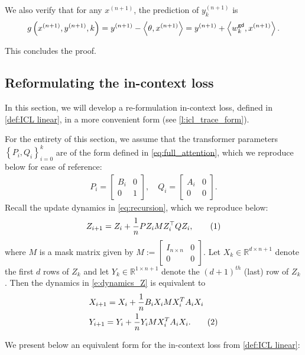 \documentclass{article}
\newcommand{\R}{\mathbb{R}}
\renewcommand{\aa}{M}
\newcommand{\tx}[1]{x^{(#1)}}
\newcommand{\ty}[1]{y^{(#1)}}
\newcommand{\wgd}{w^{\sf gd}}
\newcommand*\lin[1]{\left\langle #1 \right\rangle}
\newcommand*\lrp[1]{\left( #1 \right)}
\newcommand*\lrbb[1]{\left\{ #1 \right\}}
\newcommand\numberthis{\addtocounter{equation}{1}\tag{\theequation}}
\begin{document}
We also verify that for any $\tx{n+1}$, the prediction of $\ty{n+1}_k$ is 
\begin{align*}
g\lrp{\tx{n+1}, \ty{n+1}, k} = \ty{n+1} -\lin{\theta, \tx{n+1}} = \ty{n+1} + \lin{\wgd_k, \tx{n+1}}.
\end{align*}

This concludes the proof.



 
\subsection{Reformulating the in-context loss}
In this section, we will develop a re-formulation in-context loss, defined in \eqref{def:ICL linear}, in a more convenient form (see \autoref{l:icl_trace_form}).

For the entirety of this section, we assume that the transformer parameters $\lrbb{P_i,Q_i}_{i=0}^k$ are of the form defined in \eqref{eq:full_attention}, which we reproduce below for ease of reference:
\begin{align}
P_i = \begin{bmatrix}
B_i & 0 \\ 
0 & 1
\end{bmatrix}, \quad Q_i = \begin{bmatrix}
A_i & 0 \\ 
0 & 0
\end{bmatrix}.
\end{align}
Recall the update dynamics in \eqref{eq:recursion}, which we reproduce below:
\begin{align*}
Z_{i+1} = Z_{i} + \frac{1}{n}  P Z_i \aa Z_i^\top Q Z_i,
\numberthis \label{e:dynamics_Z}
\end{align*}
where $M$ is a mask matrix given by $M := \begin{bmatrix}I_{n\times n} & 0 \\ 0 & 0\end{bmatrix}$. Let $X_k \in \R^{d\times n+1}$ denote the first $d$ rows of $Z_k$ and let $Y_k \in \R^{1\times n+1}$ denote the $(d+1)^{th}$ (last) row of $Z_k$. Then the dynamics in \eqref{e:dynamics_Z} is equivalent to
\begin{align*}
& X_{i+1} = X_i + \frac{1}{n} B_i X_i M X_i^T A_i X_i\\
& Y_{i+1} = Y_i + \frac{1}{n}Y_i M X_i^T A_i X_i.
\numberthis \label{e:dynamics_XY}
\end{align*}

We present below an equivalent form for the in-context loss from \eqref{def:ICL linear}:
\end{document}
